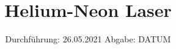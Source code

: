 

\subject{V 61}
\title{Helium-Neon Laser}
\date{%
  Durchführung: 26.05.2021
  \hspace{3em}
  Abgabe: DATUM
}



\maketitle
\thispagestyle{empty}
\tableofcontents
\newpage


%

%

%

\printbibliography{}


